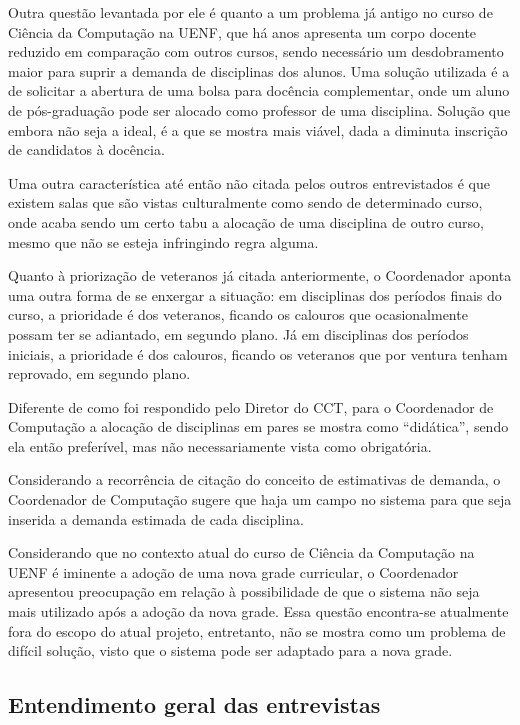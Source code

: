 Outra questão levantada por ele é quanto a um problema já antigo no curso de Ciência da Computação na UENF, que há anos apresenta um corpo docente reduzido em comparação com outros cursos, sendo necessário um desdobramento maior para suprir a demanda de disciplinas dos alunos. Uma solução utilizada é a de solicitar a abertura de uma bolsa para docência complementar, onde um aluno de pós-graduação pode ser alocado como professor de uma disciplina. Solução que embora não seja a ideal, é a que se mostra mais viável, dada a diminuta inscrição de candidatos à docência.

Uma outra característica até então não citada pelos outros entrevistados é que existem salas que são vistas culturalmente como sendo de determinado curso, onde acaba sendo um certo tabu a alocação de uma disciplina de outro curso, mesmo que não se esteja infringindo regra alguma.

Quanto à priorização de veteranos já citada anteriormente, o Coordenador aponta uma outra forma de se enxergar a situação: em disciplinas dos períodos finais do curso, a prioridade é dos veteranos, ficando os calouros que ocasionalmente possam ter se adiantado, em segundo plano. Já em disciplinas dos períodos iniciais, a prioridade é dos calouros, ficando os veteranos que por ventura tenham reprovado, em segundo plano.

Diferente de como foi respondido pelo Diretor do CCT, para o Coordenador de Computação a alocação de disciplinas em pares se mostra como ``didática'', sendo ela então preferível, mas não necessariamente vista como obrigatória.

Considerando a recorrência de citação do conceito de estimativas de demanda, o Coordenador de Computação sugere que haja um campo no sistema para que seja inserida a demanda estimada de cada disciplina.

Considerando que no contexto atual do curso de Ciência da Computação na UENF é iminente a adoção de uma nova grade curricular, o Coordenador apresentou preocupação em relação à possibilidade de que o sistema não seja mais utilizado após a adoção da nova grade. Essa questão encontra-se atualmente fora do escopo do atual projeto, entretanto, não se mostra como um problema de difícil solução, visto que o sistema pode ser adaptado para a nova grade.

\subsection{Entendimento geral das entrevistas} \label{subsec:conclusaoEntrevistas} %

